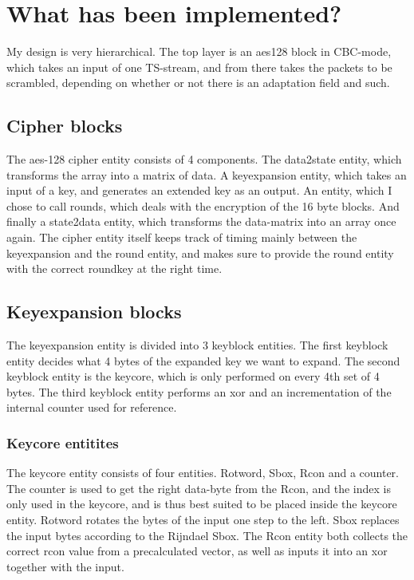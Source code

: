 \section{What has been implemented?}
My design is very hierarchical. The top layer is an aes128 block in CBC-mode, 
which takes an input of one TS-stream, and from there takes the packets to be 
scrambled, depending on whether or not there is an adaptation field and such.

\subsection{Cipher blocks}
The aes-128 cipher entity consists of 4 components. The data2state entity, which 
transforms the array into a matrix of data. A keyexpansion entity, which takes 
an input of a key, and generates an extended key as an output. An entity, which I
chose to call rounds, which deals with the encryption of the 16 byte blocks. And 
finally a state2data entity, which transforms the data-matrix into an array once 
again. The cipher entity itself keeps track of timing mainly between the 
keyexpansion and the round entity, and makes sure to provide the round entity 
with the correct roundkey at the right time.

\subsection{Keyexpansion blocks}
The keyexpansion entity is divided into 3 keyblock entities. The first keyblock 
entity decides what 4 bytes of the expanded key we want to expand. The second 
keyblock entity is the keycore, which is only performed on every 4th set of 
4 bytes. The third keyblock entity performs an xor and an incrementation of the 
internal counter used for reference.

\subsubsection{Keycore entitites}
The keycore entity consists of four entities. Rotword, Sbox, Rcon and a counter. 
The counter is used to get the right data-byte from the Rcon, and the index is 
only used in the keycore, and is thus best suited to be placed inside the 
keycore entity. Rotword rotates the bytes of the input one step to the left. 
Sbox replaces the input bytes according to the Rijndael Sbox. The Rcon entity 
both collects the correct rcon value from a precalculated vector, as well as 
inputs it into an xor together with the input.

